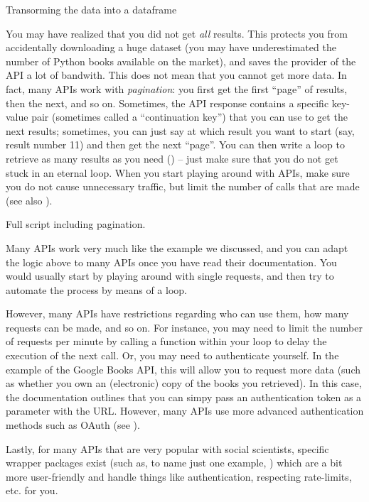 \begin{ccsexample}
  \caption{Transorming the data into a dataframe}\label{ex:googleapi2}
\end{ccsexample}

You may have realized that you did not get \emph{all} results.
This protects you from accidentally downloading a huge dataset (you
may have underestimated the number of Python books available on the
market), and saves the provider of the API a lot of bandwith.
This does not mean that you cannot get more data. In fact, many APIs work
with \emph{pagination}: you first get the first ``page'' of results,
then the next, and so on. Sometimes, the API response contains
a specific key-value pair (sometimes called a ``continuation key'')
that you can use to get the next results; sometimes, you can just
say at which result you want to start (say, result number 11) and
then get the next ``page''. You can then write a loop to retrieve
as many results as you need () -- just make sure
that you do not get stuck in an eternal loop. When you start playing
around with APIs, make sure you do not cause unnecessary traffic,
but limit the number of calls that are made (see also ).


\begin{ccsexample}
  \caption{Full script including pagination.}\label{ex:googleapi3}
\end{ccsexample}



Many APIs work very much like the example we discussed, and you
can adapt the logic above to many APIs once you have read their
documentation. You would usually start by playing around with
single requests, and then try to automate the process by means
of a loop.

However, many APIs have restrictions regarding who can use them,
how many requests can be made, and so on.
For instance, you may need to limit the number of requests per minute
by calling a  function within your loop to delay the
execution of the next call. Or, you may need to authenticate
yourself. In the example of the Google Books API, this will
allow you to request more data (such as whether you own an
(electronic) copy of the books you retrieved). In this case,
the documentation outlines that you can simpy pass an authentication
token as a parameter with the URL. However, many APIs use
more advanced authentication methods such as OAuth (see ).

Lastly, for many APIs that are very popular with social
scientists, specific wrapper packages exist (such as, to name just one example, )
which are a bit more user-friendly and handle things like authentication,
respecting rate-limits, etc. for you.
